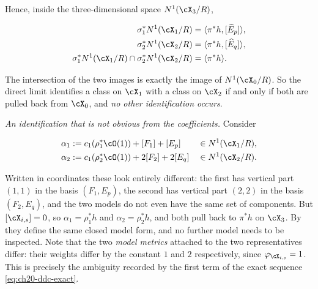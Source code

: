 \begin{example}
Hence, inside the three-dimensional space \(N^1(\cX_3/R)\),

\begin{equation}
\label{eq:ch20-two-model-images}
 \begin{aligned}
 \sigma_1^*N^1(\cX_1/R)
   &=\langle\pi^*h,[\widehat E_p]\rangle,\\
 \sigma_2^*N^1(\cX_2/R)
   &=\langle\pi^*h,[\widehat E_q]\rangle,\\
 \sigma_1^*N^1(\cX_1/R)\cap\sigma_2^*N^1(\cX_2/R)
   &=\langle\pi^*h\rangle .
 \end{aligned}
\end{equation}

The intersection of the two images is exactly the image of
\(N^1(\cX_0/R)\).  So the direct limit identifies a class on \(\cX_1\) with
a class on \(\cX_2\) if and only if both are pulled back from \(\cX_0\),
and \emph{no other identification occurs}.

\emph{An identification that is not obvious from the coefficients.}
Consider

\[
\begin{aligned}
 \alpha_1&:=c_1(\rho_1^*\cO(1))+[F_1]+[E_p]&&\in N^1(\cX_1/R),\\
 \alpha_2&:=c_1(\rho_2^*\cO(1))+2[F_2]+2[E_q]&&\in N^1(\cX_2/R).
\end{aligned}
\]

Written in coordinates these look entirely different: the first has vertical
part \((1,1)\) in the basis \((F_1,E_p)\), the second has vertical part
\((2,2)\) in the basis \((F_2,E_q)\), and the two models do not even have
the same set of components.  But \([\cX_{i,s}]=0\), so
\(\alpha_1=\rho_1^*h\) and \(\alpha_2=\rho_2^*h\), and both pull back to
\(\pi^*h\) on \(\cX_3\).  By
 they define the same closed model
form, and no further model needs to be inspected.  Note that the two
\emph{model metrics} attached to the two representatives differ: their
weights differ by the constant \(1\) and \(2\) respectively, since
\(\varphi_{\cX_{i,s}}=1\).  This is precisely the ambiguity recorded by the
first term of the exact sequence \eqref{eq:ch20-ddc-exact}.


\end{example}

